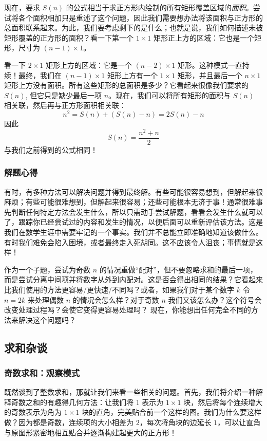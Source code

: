 现在，要求 $S(n)$ 的公式相当于求正方形内绘制的所有矩形覆盖区域的\emph{面积}。尝试将各个面积相加只是重述了这个问题，因此我们需要想办法将该面积与正方形的总面积联系起来。为此，我们要考虑剩下的是什么；也就是说，我们如何描述未被矩形覆盖的正方形的面积？看一下第一个 $1 \times 1$ 矩形正上方的区域：它也是一个矩形，尺寸为 $(n - 1) \times 1$。

看一下 $2 \times 1$ 矩形上方的区域：它是一个 $(n-2) \times 1$ 矩形。这种模式一直持续！最终，我们在 $(n - 1) \times 1$ 矩形上方有一个 $1 \times 1$ 矩形，并且最后一个 $n \times 1$ 矩形上方没有面积。所有这些矩形的总面积是多少？它看起来很像我们要求的 $S(n)$, 但它只是缺少最后一项 $n$。现在，我们可以将所有矩形的面积与 $S(n)$ 相关联，然后再与正方形面积相关联：
\[n^2 = S(n) + (S(n) - n) = 2S(n) - n\]
因此
\[S(n) = \frac{n^2+n}{2}\]
与我们之前得到的公式相同！

\subsubsection*{解题心得}

有时，有多种方法可以解决问题并得到最终解。有些可能很容易想到，但解起来很麻烦；有些可能很难想到，但解起来很容易；还些可能根本无济于事！通常很难事先判断任何特定方法会发生什么，所以只需动手尝试解题，看看会发生什么就可以了，跟踪你已经尝试过的内容和发生的情况，以便后面可以重新评估该方法。这是我们在数学生涯中需要牢记的一个事实。我们并不总能立即准确地知道该做什么。有时我们难免会陷入困境，或者最终走入死胡同。这不应该令人沮丧；事情就是这样！

作为一个子题，尝试为奇数 $n$ 的情况重做``配对''，但不要忽略求和的最后一项，而是尝试分离中间项并将数字从外到内配对。这是否会得出相同的结果？它看起来比我们使用的方法更容易/更快速/不同吗？或者，如果我们对于某个数字 $k$ 令 $n=2k$ 来处理偶数 $n$ 的情况会怎么样？对于奇数 $n$ 我们又该怎么办？这个符号会改变处理过程吗？会使它变得更容易处理吗？ 现在，你能想出任何完全不同的方法来解决这个问题吗？ 

\subsection{求和杂谈}\label{sec:section1.4.3}

\subsubsection*{奇数求和：观察模式}

既然谈到了整数求和，那就让我们来看一些相关的问题。首先，我们将介绍一种解释奇数之和的有趣得几何方法：让我们将 $1$ 表示为 $1 \times 1$ 块，然后将每个连续增大的奇数表示为角为 $1 \times 1$ 块的直角，完美贴合前一个这样的图。我们为什么要这样做？因为都是奇数，连续项的大小相差为 $2$，每次将角块的边延长 $1$，可以让直角与原图形紧密地相互贴合并逐渐构建起更大的正方形！

